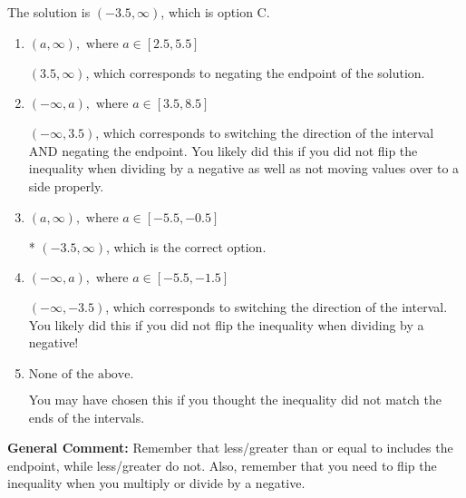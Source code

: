 \documentclass{extbook}[14pt]
\begin{document}
\begin{enumerate}
{The solution is \( (-3.5, \infty) \), which is option C.\begin{enumerate}[label=\Alph*.]
\item \( (a, \infty), \text{ where } a \in [2.5, 5.5] \)

 $(3.5, \infty)$, which corresponds to negating the endpoint of the solution.
\item \( (-\infty, a), \text{ where } a \in [3.5, 8.5] \)

 $(-\infty, 3.5)$, which corresponds to switching the direction of the interval AND negating the endpoint. You likely did this if you did not flip the inequality when dividing by a negative as well as not moving values over to a side properly.
\item \( (a, \infty), \text{ where } a \in [-5.5, -0.5] \)

* $(-3.5, \infty)$, which is the correct option.
\item \( (-\infty, a), \text{ where } a \in [-5.5, -1.5] \)

 $(-\infty, -3.5)$, which corresponds to switching the direction of the interval. You likely did this if you did not flip the inequality when dividing by a negative!
\item \( \text{None of the above}. \)

You may have chosen this if you thought the inequality did not match the ends of the intervals.
\end{enumerate}

\textbf{General Comment:} Remember that less/greater than or equal to includes the endpoint, while less/greater do not. Also, remember that you need to flip the inequality when you multiply or divide by a negative.
}
\end{enumerate}
\end{document}
